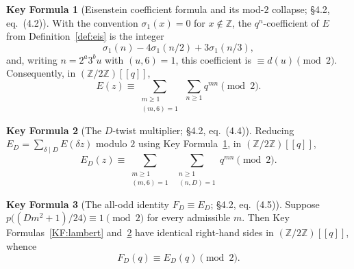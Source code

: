 \documentclass[11pt]{article}
\newcommand{\Z}{\mathbb{Z}}
\theoremstyle{definition}
\newtheorem{keyformula}{Key Formula}
\begin{document}
\begin{keyformula}[Eisenstein coefficient formula and its mod-$2$ collapse; \S4.2, eq.~(4.2)]\label{KF:eis-mod2}
With the convention $\sigma_1(x)=0$ for $x\notin\Z$, the $q^n$-coefficient of $E$ from
Definition~\ref{def:eis} is the integer
\[
\sigma_1(n)-4\sigma_1(n/2)+3\sigma_1(n/3),
\]
and, writing $n=2^a3^bu$ with $(u,6)=1$, this coefficient is $\equiv d(u)\pmod2$. Consequently, in
$(\Z/2\Z)[[q]]$,
\[
E(z)\equiv\sum_{\substack{m\ge1\\(m,6)=1}}\ \sum_{n\ge1}q^{mn}\pmod2 .
\]
\end{keyformula}


\begin{keyformula}[The $D$-twist multiplier; \S4.2, eq.~(4.4)]\label{KF:ED-mod2}
Reducing $E_D=\sum_{\delta\mid D}E(\delta z)$ modulo $2$ using Key Formula~\ref{KF:eis-mod2}, in
$(\Z/2\Z)[[q]]$,
\[
E_D(z)\equiv\sum_{\substack{m\ge1\\(m,6)=1}}\ \sum_{\substack{n\ge1\\(n,D)=1}}q^{mn}\pmod2 .
\]
\end{keyformula}


\begin{keyformula}[The all-odd identity $F_D\equiv E_D$; \S4.2, eq.~(4.5)]\label{KF:FeqE}
Suppose $p\bigl((Dm^2+1)/24\bigr)\equiv1\pmod2$ for every admissible $m$. Then Key
Formulas~\ref{KF:lambert} and~\ref{KF:ED-mod2} have identical right-hand sides in
$(\Z/2\Z)[[q]]$, whence
\[
F_D(q)\equiv E_D(q)\pmod2 .
\]
\end{keyformula}
\end{document}
